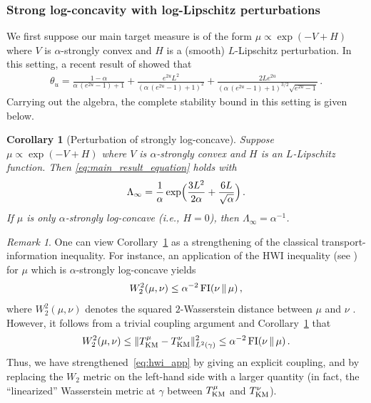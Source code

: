 \documentclass[12pt]{article}
\newcommand{\1}{\mathds{1}}
\newcommand{\mmid}{\,\Vert\,}
\theoremstyle{plain}
\newtheorem{corollary}[theorem]{Corollary}
\theoremstyle{definition}
\theoremstyle{remark}
\newtheorem{remark}[theorem]{Remark}
\begin{document}
\subsubsection{Strong log-concavity with log-Lipschitz perturbations}\label{sec:slc_pert}
We {first} suppose our main target measure is of the form $\mu\propto\exp(-V+H)$ where $V$ is $\alpha$-strongly convex and $H$ is a (smooth) $L$-Lipschitz perturbation. In this setting, a recent result of \cite{BriPed25HeatFlow} showed that
\begin{align}\label{eq:bartheta_bp24}
    \theta_{u} = \frac{1-\alpha}{\alpha\,(e^{2u} - 1) + 1} + \frac{e^{2u}L^2}{(\alpha\,(e^{2u}-1) + 1)^2} + \frac{2L e^{2u}}{(\alpha\,(e^{2u}-1) + 1)^{3/2}\sqrt{e^{2u}-1}}\,.
\end{align}
Carrying out the algebra, the complete stability bound in this setting is given below. 
\begin{corollary}[Perturbation of strongly log-concave]\label{cor:pert}
Suppose $\mu \propto\exp(-V{+}H)$ where $V$ is $\alpha$-strongly convex and $H$ is an $L$-Lipschitz function. {Then \eqref{eq:main_result_equation} holds with 
\begin{align*}
    \Lambda_\infty = \frac{1}{\alpha}\exp\Bigl(\frac{3L^2}{2\alpha} + \frac{6L}{\sqrt{\alpha}}\Bigr)\,.
\end{align*}
If $\mu$ is only $\alpha$-strongly log-concave (i.e., $H=0$), then $\Lambda_\infty = \alpha^{-1}$.}
\end{corollary}
{\begin{remark}
One can view Corollary~\ref{cor:pert} as a strengthening of the classical transport-information inequality. For instance, an application of the HWI inequality (see \cite{gentil2020entropic}) for $\mu$ which is $\alpha$-strongly log-concave yields
\begin{align}\label{eq:hwi_app}
    W_2^2(\mu,\nu) \leq \alpha^{-2}\,{\rm FI}(\nu\mmid\mu)\,,
\end{align}
where $W_2^2(\mu,\nu)$ denotes the squared $2$-Wasserstein distance between $\mu$ and $\nu$ {\cite{otto2000generalization}}. However, it follows from a trivial coupling argument and Corollary~\ref{cor:pert} that
\begin{align*}
    W_2^2(\mu,\nu) \leq \| T_{\rm{KM}}^\mu - T_{\rm{KM}}^\nu\|^2_{L^2(\gamma)} \leq \alpha^{-2}\,{\rm FI}(\nu\mmid\mu)\,.
\end{align*}
Thus, we have strengthened~\eqref{eq:hwi_app} by giving an explicit coupling, and by replacing the $W_2$ metric on the left-hand side with a larger quantity (in fact, the ``linearized'' Wasserstein metric at $\gamma$ between $T_{\rm{KM}}^\mu$ and $T_{\rm{KM}}^\nu$).
\end{remark}}
\end{document}
